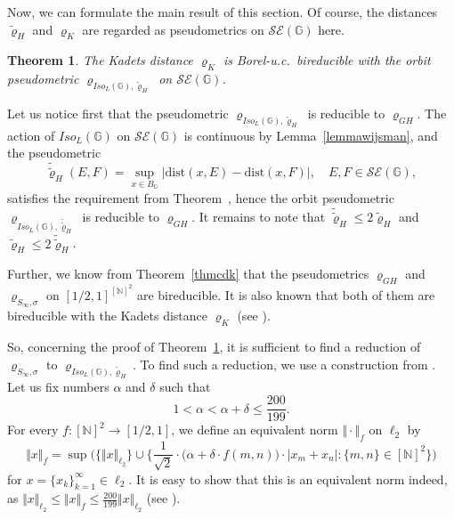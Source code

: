 \documentclass[a4paper]{amsart}
\theoremstyle{plain}
\newtheorem{theorem}{Theorem}[section]
\theoremstyle{remark}
\begin{document}
Now, we can formulate the main result of this section. Of course, the distances $ \tilde{\varrho}_{H} $ and $ \varrho_{K} $ are regarded as pseudometrics on $ \mathcal{SE}(\mathbb{G}) $ here.


\begin{theorem} \label{thmmain4}
The Kadets distance $ \varrho_{K} $ is Borel-u.c.~bireducible with the orbit pseudometric $ \varrho_{Iso_{L}(\mathbb{G}), \tilde{\varrho}_{H}} $ on $ \mathcal{SE}(\mathbb{G}) $.
\end{theorem}


Let us notice first that the pseudometric $ \varrho_{Iso_{L}(\mathbb{G}), \tilde{\varrho}_{H}} $ is reducible to $ \varrho_{GH} $. The action of $ Iso_{L}(\mathbb{G}) $ on $ \mathcal{SE}(\mathbb{G}) $ is continuous by Lemma~\ref{lemmawijsman}, and the pseudometric
$$ \tilde{\tilde{\varrho}}_{H}(E, F) = \sup_{x \in B_{\mathbb{G}}} \big| \mathrm{dist}(x, E) - \mathrm{dist}(x, F) \big|, \quad E, F \in \mathcal{SE}(\mathbb{G}), $$
satisfies the requirement from Theorem~, hence the orbit pseudometric $ \varrho_{Iso_{L}(\mathbb{G}), \tilde{\tilde{\varrho}}_{H}} $ is reducible to $ \varrho_{GH} $. It remains to note that $ \tilde{\tilde{\varrho}}_{H} \leq 2 \tilde{\varrho}_{H} $ and $ \tilde{\varrho}_{H} \leq 2 \tilde{\tilde{\varrho}}_{H} $.

Further, we know from Theorem~\ref{thmcdk} that the pseudometrics $ \varrho_{GH} $ and $ \varrho_{S_{\infty}, \sigma} $ on $ [1/2, 1]^{[\mathbb{N}]^{2}} $ are bireducible. It is also known that both of them are bireducible with the Kadets distance $ \varrho_{K} $ (see \cite[Theorems~46 and~48]{cdk2}).

So, concerning the proof of Theorem~\ref{thmmain4}, it is sufficient to find a reduction of $ \varrho_{S_{\infty}, \sigma} $ to $ \varrho_{Iso_{L}(\mathbb{G}), \tilde{\varrho}_{H}} $. To find such a reduction, we use a construction from \cite[Section~4]{cdk2}. Let us fix numbers $ \alpha $ and $ \delta $ such that
$$ 1 < \alpha < \alpha + \delta \leq \frac{200}{199}. $$
For every $ f : [\mathbb{N}]^{2} \to [1/2, 1] $, we define an equivalent norm $ \Vert \cdot \Vert_{f} $ on $ \ell_{2} $ by
$$ \Vert x \Vert_{f} = \sup \Big( \{ \Vert x \Vert_{\ell_{2}} \} \cup \Big\{ \frac{1}{\sqrt{2}} \cdot \big( \alpha + \delta \cdot f(m, n) \big) \cdot |x_{m}+x_{n}| : \{ m, n \} \in [\mathbb{N}]^{2} \Big\} \Big) $$
for $ x = \{ x_{k} \}_{k=1}^{\infty} \in \ell_{2} $. It is easy to show that this is an equivalent norm indeed, as $ \Vert x \Vert_{\ell_{2}} \leq \Vert x \Vert_{f} \leq \frac{200}{199} \Vert x \Vert_{\ell_{2}} $ (see \cite{cdk2}).
\end{document}
